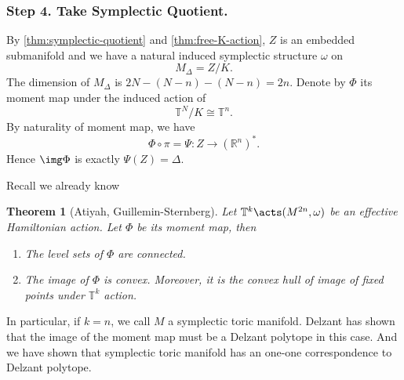 \documentclass[12pt]{article}
\theoremstyle{plain}\newtheorem{theorem}{Theorem}
\theoremstyle{definition}\newtheorem{definition}[theorem]{Definition}
\theoremstyle{definition}\newtheorem{example}[theorem]{Example}
\theoremstyle{plain}\newtheorem{axiom}[theorem]{Axiom}
\theoremstyle{plain}\newtheorem{assertion}[theorem]{Assertion}
\theoremstyle{plain}\newtheorem{corollary}[theorem]{Corollary}
\theoremstyle{plain}\newtheorem{lemma}[theorem]{Lemma}
\theoremstyle{plain}\newtheorem{proposition}[theorem]{Proposition}
\theoremstyle{plain}\newtheorem{prop}[theorem]{Proposition}
\theoremstyle{plain}\newtheorem{conjecture}[theorem]{Conjecture}
\theoremstyle{plain}\newtheorem{conj}[theorem]{Conjecture}
\theoremstyle{plain}\newtheorem{problem}[theorem]{Problem}
\theoremstyle{remark}\newtheorem{notation}[theorem]{Notation}
\theoremstyle{definition}\newtheorem*{question}{Question}
\theoremstyle{definition}\newtheorem*{answer}{Answer}
\theoremstyle{definition}\newtheorem*{goal}{Goal}
\theoremstyle{plain}\newtheorem*{application}{Application}
\theoremstyle{plain}\newtheorem*{exercise}{Exercise}
\theoremstyle{remark}\newtheorem*{remark}{Remark}
\theoremstyle{remark}\newtheorem*{note}{\small{Note}}
\numberwithin{equation}{section}
\numberwithin{theorem}{section}
\numberwithin{figure}{section}
\begin{document}
\subsubsection*{Step 4. Take Symplectic Quotient.}
By \cref{thm:symplectic-quotient} and \cref{thm:free-K-action}, \(Z\) is an embedded
submanifold and we have a natural induced symplectic structure \(\omega\) on \[
    M_\Delta=Z/K
.\] The dimension of \(M_\Delta\) is \(2N-(N-n)-(N-n)=2n\).
Denote by \(\Phi\) its moment map under the induced action of \[
    \mathbb{T}^N/K\cong \mathbb{T}^n
.\] By naturality of moment map, we have \[
    \Phi\circ \pi=\Psi\colon Z\longrightarrow (\mathbb{R}^n)^*
.\] Hence \(\img \Phi\) is exactly \(\Psi(Z)=\Delta\).

Recall we already know
\begin{theorem}[Atiyah, Guillemin-Sternberg]
    Let \(\mathbb{T}^k\acts (M^{2n},\omega)\) be an effective Hamiltonian action.
    Let \(\Phi\) be its moment map, then
    \begin{enumerate}[(1)]
    \item The level sets of \(\Phi\) are connected.
    \item The image of \(\Phi\) is convex. Moreover, it is the convex hull
        of image of fixed points under \(\mathbb{T}^k\) action.
    \end{enumerate}
\end{theorem}
In particular, if \(k=n\), we call \(M\) a symplectic toric manifold. Delzant has
shown that the image of the moment map must be a Delzant polytope in this case.
And we have shown that symplectic toric manifold has an one-one correspondence
to Delzant polytope.
\end{document}
